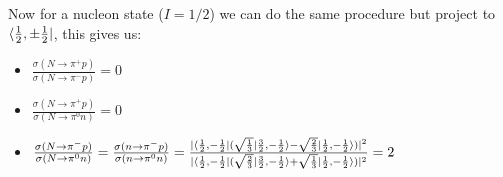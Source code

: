 \documentclass[10pt,a4paper,twoside]{article}
\begin{document}
Now for a nucleon state ($I=1/2$)  we can do the same procedure but project to $\bra{\frac{1}{2},\pm\frac{1}{2}}$, this gives us:
\begin{itemize}
	\item $\frac{\sigma(N \rightarrow \pi^+p)}{\sigma(N \rightarrow \pi^-p)} = 0$
	\item $\frac{\sigma(N \rightarrow \pi^+p)}{\sigma(N \rightarrow \pi^0n)} = 0$
	\item $\frac{\sigma(N \rightarrow \pi^-p)}{\sigma(N \rightarrow \pi^0n)} = \frac{\sigma(n \rightarrow \pi^-p)}{\sigma(n\rightarrow\pi^0n)}=
	\frac{|\bra{\frac{1}{2},-\frac{1}{2}}(\sqrt{\frac{1}{3}}\ket{\frac{3}{2},-\frac{1}{2}}-\sqrt{\frac{2}{3}}\ket{\frac{1}{2},-\frac{1}{2}})|^2}{|\bra{\frac{1}{2},-\frac{1}{2}}(\sqrt{\frac{2}{3}}\ket{\frac{3}{2},-\frac{1}{2}} + \sqrt{\frac{1}{3}}\ket{\frac{1}{2},-\frac{1}{2}})|^2} = 2$
\end{itemize}
\end{document}
